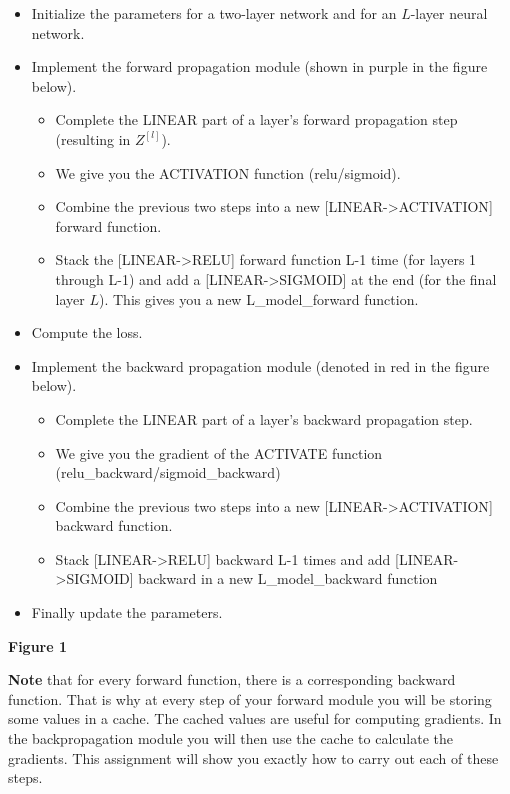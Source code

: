 \documentclass[11pt]{article}
\providecommand{\tightlist}{%
      \setlength{\itemsep}{0pt}\setlength{\parskip}{0pt}}
\begin{document}
\begin{itemize}
\tightlist
\item
  Initialize the parameters for a two-layer network and for an
  \(L\)-layer neural network.
\item
  Implement the forward propagation module (shown in purple in the
  figure below).

  \begin{itemize}
  \tightlist
  \item
    Complete the LINEAR part of a layer's forward propagation step
    (resulting in \(Z^{[l]}\)).
  \item
    We give you the ACTIVATION function (relu/sigmoid).
  \item
    Combine the previous two steps into a new
    {[}LINEAR-\textgreater{}ACTIVATION{]} forward function.
  \item
    Stack the {[}LINEAR-\textgreater{}RELU{]} forward function L-1 time
    (for layers 1 through L-1) and add a
    {[}LINEAR-\textgreater{}SIGMOID{]} at the end (for the final layer
    \(L\)). This gives you a new L\_model\_forward function.
  \end{itemize}
\item
  Compute the loss.
\item
  Implement the backward propagation module (denoted in red in the
  figure below).

  \begin{itemize}
  \tightlist
  \item
    Complete the LINEAR part of a layer's backward propagation step.
  \item
    We give you the gradient of the ACTIVATE function
    (relu\_backward/sigmoid\_backward)
  \item
    Combine the previous two steps into a new
    {[}LINEAR-\textgreater{}ACTIVATION{]} backward function.
  \item
    Stack {[}LINEAR-\textgreater{}RELU{]} backward L-1 times and add
    {[}LINEAR-\textgreater{}SIGMOID{]} backward in a new
    L\_model\_backward function
  \end{itemize}
\item
  Finally update the parameters.
\end{itemize}

\textbf{Figure 1}

\textbf{Note} that for every forward function, there is a corresponding
backward function. That is why at every step of your forward module you
will be storing some values in a cache. The cached values are useful for
computing gradients. In the backpropagation module you will then use the
cache to calculate the gradients. This assignment will show you exactly
how to carry out each of these steps.
\end{document}
